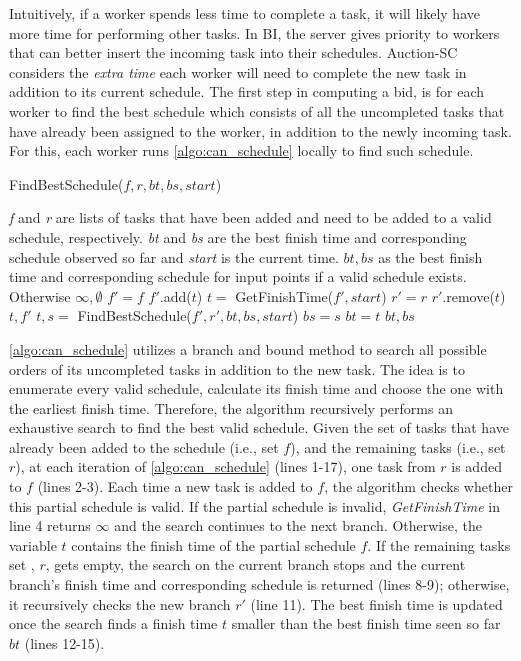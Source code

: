 Intuitively, if a worker spends less time to complete a task, it will likely have more time for performing other tasks. In BI, the server gives priority to workers that can better insert the incoming task into their schedules. Auction-SC considers the \textit{extra time} each worker will need to complete the new task in addition to its current schedule. The first step in computing a bid, is for each worker to find the best schedule which consists of all the uncompleted tasks that have already been assigned to the worker, in addition to the newly incoming task. For this, each worker runs \cref{algo:can_schedule} locally to find such schedule.

\begin{algorithm}[!ht]
	\caption{FindBestSchedule($f, r, bt, bs, start$)}
	\label{algo:can_schedule}
	\begin{algorithmic}[1]
		\REQUIRE \emph{f} and \emph{r} are lists of tasks that have been added and need to be added to a valid schedule, respectively. \emph{bt} and \emph{bs} are the best finish time and corresponding schedule observed so far and \emph{start} is the current time.
		\ENSURE $bt, bs$ as the best finish time and corresponding schedule for input points if a valid schedule exists. Otherwise $\infty, \emptyset$
			\STATE $f' = f$
			\STATE $f'$.add($t$)
			\STATE $t =$ GetFinishTime($f', start$)
				\STATE $r' = r$
				\STATE $r'$.remove($t$)
					\RETURN $t, f'$
				\ENDIF
				\STATE $t, s =$ FindBestSchedule($f', r', bt, bs, start$)
					\STATE $bs = s$
					\STATE $bt = t$
				\ENDIF
			\ENDIF
		\ENDFOR
		\RETURN $bt, bs$
	\end{algorithmic} \vspace{-1mm}
\end{algorithm}

\cref{algo:can_schedule} utilizes a branch and bound method to search all possible orders of its uncompleted tasks in addition to the new task. The idea is to enumerate every valid schedule, calculate its finish time and choose the one with the earliest finish time. Therefore, the algorithm recursively performs an exhaustive search to find the best valid schedule. Given the set of tasks that have already been added to the schedule (i.e., set $f$), and the remaining tasks (i.e., set $r$), at each iteration of \cref{algo:can_schedule} (lines 1-17), one task from $r$ is added to $f$ (lines 2-3). Each time a new task is added to $f$, the algorithm checks whether this partial schedule is valid. If the partial schedule is invalid, \textit{GetFinishTime} in line 4 returns $\infty$ and the search continues to the next branch. Otherwise, the variable $t$ contains the finish time of the partial schedule $f$. If the remaining tasks set , $r$, gets empty, the search on the current branch stops and the current branch's finish time and corresponding schedule is returned (lines 8-9); otherwise, it recursively checks the new branch $r'$ (line 11). The best finish time is updated once the search finds a finish time $t$ smaller than the best finish time seen so far $bt$ (lines 12-15).


